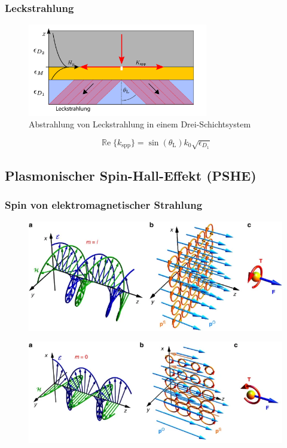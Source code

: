 \documentclass[aspectratio=1610]{beamer}
\renewcommand{\Re}{\operatorname{\mathbb{R}e}}
\begin{document}
		\begin{frame}
			\frametitle{Leckstrahlung}
			\begin{figure}[h] 
				\centering
				\includegraphics[width=0.7\textwidth]{figures/leckstrahlung.pdf}
				\caption[Leckstrahlung Drei-Schichtsystem]{Abstrahlung von Leckstrahlung in einem Drei-Schichtsystem}
			\end{figure}
			\begin{equation}
				\boxed{\Re\{k_{\mathrm{spp}}\}=\sin(\theta_\mathrm{L}) k_0 \sqrt{\epsilon_{D_1}}}
			\end{equation}
		\end{frame}	
		
	
	

		\subsection{Plasmonischer Spin-Hall-Effekt (PSHE)}
			\begin{frame}
				\frametitle{Spin von elektromagnetischer Strahlung}
				\begin{figure}[h]
					\centering
					\includegraphics[width=0.7\linewidth]{figures/spin/prop_spin}
				\end{figure}
				\begin{figure}[h]
					\centering
					\includegraphics[width=0.7\linewidth]{figures/spin/ev_spin}
				\end{figure}				
			\end{frame}
		
\end{document}
